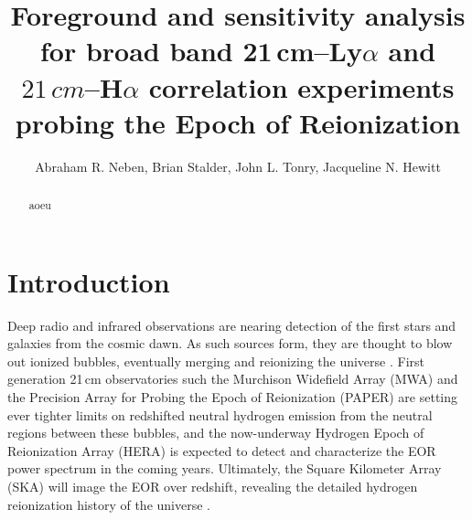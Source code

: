 \documentclass{emulateapj}
\begin{document}
\title{Foreground and sensitivity analysis for broad band 21\,cm--Ly$\alpha$ and $21\,cm$--H$\alpha$ correlation experiments probing the Epoch of Reionization}


\author{Abraham R. Neben,
Brian Stalder,
John L. Tonry,
Jacqueline N. Hewitt}




\begin{abstract}
aoeu
\end{abstract}


\section{Introduction}

Deep radio and infrared observations are nearing detection of the first stars and galaxies from the cosmic dawn. As such sources form, they are thought to blow out ionized bubbles, eventually merging and reionizing the universe \citep{FurlanettoReview,miguelreview,PritchardLoebReview}. First generation 21\,cm observatories such the Murchison Widefield Array (MWA) \citep{tingay13,mwascience} and the Precision Array for Probing the Epoch of Reionization (PAPER) \citep{parsons14,ali15,PoberPAPER64Heating,DannyMultiRedshift} are setting ever tighter limits on redshifted neutral hydrogen emission from the neutral regions between these bubbles, and the now-underway Hydrogen Epoch of Reionization Array (HERA) \citep{deboer16} is expected to detect and characterize the EOR power spectrum in the coming years. Ultimately, the Square Kilometer Array (SKA) will image the EOR over redshift, revealing the detailed hydrogen reionization history of the universe \citep{ska}. 
\end{document}
